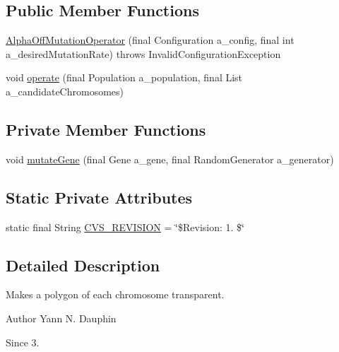 \subsection*{Public Member Functions}
\begin{DoxyCompactItemize}
\item 
\hyperlink{classexamples_1_1monalisa_1_1core_1_1_alpha_off_mutation_operator_afb0762339e838285d303859aeca8207a}{Alpha\-Off\-Mutation\-Operator} (final Configuration a\-\_\-config, final int a\-\_\-desired\-Mutation\-Rate)  throws Invalid\-Configuration\-Exception 
\item 
void \hyperlink{classexamples_1_1monalisa_1_1core_1_1_alpha_off_mutation_operator_a68240b26bc561f24ab1251cc97ae9252}{operate} (final Population a\-\_\-population, final List a\-\_\-candidate\-Chromosomes)
\end{DoxyCompactItemize}
\subsection*{Private Member Functions}
\begin{DoxyCompactItemize}
\item 
void \hyperlink{classexamples_1_1monalisa_1_1core_1_1_alpha_off_mutation_operator_a5a3dca2450f1e801a9beefb00d2d468f}{mutate\-Gene} (final Gene a\-\_\-gene, final Random\-Generator a\-\_\-generator)
\end{DoxyCompactItemize}
\subsection*{Static Private Attributes}
\begin{DoxyCompactItemize}
\item 
static final String \hyperlink{classexamples_1_1monalisa_1_1core_1_1_alpha_off_mutation_operator_ab0525b184bc11a073f4c5cb9a0dcad1d}{C\-V\-S\-\_\-\-R\-E\-V\-I\-S\-I\-O\-N} = \char`\"{}\$Revision\-: 1. \$\char`\"{}
\end{DoxyCompactItemize}


\subsection{Detailed Description}
Makes a polygon of each chromosome transparent.

\begin{DoxyAuthor}{Author}
Yann N. Dauphin 
\end{DoxyAuthor}
\begin{DoxySince}{Since}
3. 
\end{DoxySince}


